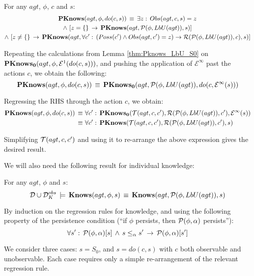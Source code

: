 \begin{thm}
\label{thm:Pknows_LbU_do}For any $agt$, $\phi$, $c$ and $s$:\begin{multline*}
\mathbf{PKnows}(agt,\phi,do(c,s))\,\equiv\,\exists z:\, Obs(agt,c,s)=z\\
\wedge\,\left[z=\{\}\,\rightarrow\,\mathbf{PKnows}(agt,\mathcal{P}(\phi,LbU(agt)),s)\right]\\
\wedge\,\left[z\neq\{\}\,\rightarrow\,\mathbf{PKnows}(agt,\forall c':\,\left(Poss(c')\wedge Obs(agt,c')=z\right)\rightarrow\mathcal{R}(\mathcal{P}(\phi,LbU(agt)),c),s)\right]\end{multline*}

\end{thm}
\begin{proofsketch}
Repeating the calculations from Lemma \ref{thm:Pknows_LbU_S0} on
$\mathbf{PKnows_{0}}(agt,\phi,\mathcal{E}^{1}(do(c,s)))$, and pushing the application
of $\mathcal{E}^{\infty}$ past the actions $c$, we obtain the following:\[
\mathbf{PKnows}(agt,\phi,do(c,s))\,\equiv\,\mathbf{PKnows_{0}}(agt,\mathcal{P}(\phi,LbU(agt)),do(c,\mathcal{E}^{\infty}(s)))\]


Regressing the RHS through the action $c$, we obtain:\begin{align*}
\mathbf{PKnows}(agt,\phi,do(c,s))\,\equiv\,\, & \forall c':\,\mathbf{PKnows_{0}}(\mathcal{T}(agt,c,c'),\mathcal{R}(\mathcal{P}(\phi,LbU(agt)),c'),\mathcal{E}^{\infty}(s))\\
\equiv\,\, & \forall c':\,\mathbf{PKnows}(\mathcal{T}(agt,c,c'),\mathcal{R}(\mathcal{P}(\phi,LbU(agt)),c'),s)\end{align*}


Simplifying $\mathcal{T}(agt,c,c')$ and using it to re-arrange the above
expression gives the desired result. 
\end{proofsketch}
We will also need the following result for individual knowledge:

\begin{thm}
\label{thm:Knows_impl_KnowsLbU}For any $agt$, $\phi$ and $s$:\[
\mathcal{D}\cup\mathcal{D}_{K}^{obs}\,\models\,\mathbf{Knows}(agt,\phi,s)\,\equiv\,\mathbf{Knows}(agt,\mathcal{P}(\phi,LbU(agt)),s)\]

\end{thm}
\begin{proofsketch}
By induction on the regression rules for knowledge, and using the
following property of the persistence condition ({}``if $\phi$ persists,
then $\mathcal{P}(\phi,\alpha)$ persists''):\[
\forall s':\,\mathcal{P}(\phi,\alpha)[s]\,\wedge\, s\leq_{\alpha}s'\,\rightarrow\,\mathcal{P}(\phi,\alpha)[s']\]


We consider three cases: $s=S_{0}$, and $s=do(c,s)$ with $c$ both
observable and unobservable. Each case requires only a simple re-arrangement
of the relevant regression rule. 
\end{proofsketch}
\medskip{}


